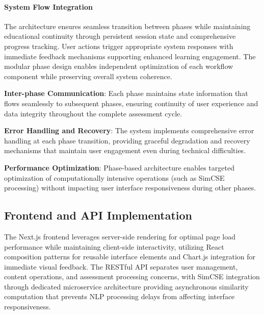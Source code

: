 {{%


\paragraph{System Flow Integration}
The architecture ensures seamless transition between phases while maintaining educational continuity through persistent session state and comprehensive progress tracking. User actions trigger appropriate system responses with immediate feedback mechanisms supporting enhanced learning engagement. The modular phase design enables independent optimization of each workflow component while preserving overall system coherence.

\textbf{Inter-phase Communication}: Each phase maintains state information that flows seamlessly to subsequent phases, ensuring continuity of user experience and data integrity throughout the complete assessment cycle.

\textbf{Error Handling and Recovery}: The system implements comprehensive error handling at each phase transition, providing graceful degradation and recovery mechanisms that maintain user engagement even during technical difficulties.

\textbf{Performance Optimization}: Phase-based architecture enables targeted optimization of computationally intensive operations (such as SimCSE processing) without impacting user interface responsiveness during other phases.

% 

\subsection{Frontend and API Implementation}

The Next.js frontend leverages server-side rendering for optimal page load performance while maintaining client-side interactivity, utilizing React composition patterns for reusable interface elements and Chart.js integration for immediate visual feedback. The RESTful API separates user management, content operations, and assessment processing concerns, with SimCSE integration through dedicated microservice architecture providing asynchronous similarity computation that prevents NLP processing delays from affecting interface responsiveness.

}}
